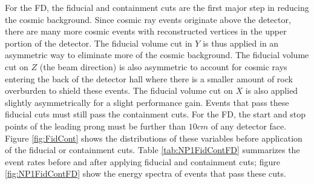 For the FD, the fiducial and containment cuts are the first major step in reducing the cosmic background. Since cosmic ray events originate above the detector, there are many more cosmic events with reconstructed vertices in the upper portion of the detector. The fiducial volume cut in $Y$ is thus applied in an asymmetric way to eliminate more of the cosmic background. The fiducial volume cut on $Z$ (the beam direction) is also asymmetric to account for cosmic rays entering the back of the detector hall where there is a smaller amount of rock overburden to shield these events. The fiducial volume cut on $X$ is also applied slightly asymmetrically for a slight performance gain. Events that pass these fiducial cuts must still pass the containment cuts. For the FD, the start and stop points of the leading prong must be further than $10\unit{cm}$ of any detector face. Figure \ref{fig:FidCont} shows the distributions of these variables before application of the fiducial or containment cuts. Table \ref{tab:NP1FidContFD} summarizes the event rates before and after applying fiducial and containment cuts; figure \ref{fig:NP1FidContFD} show the energy spectra of events that pass these cuts.
